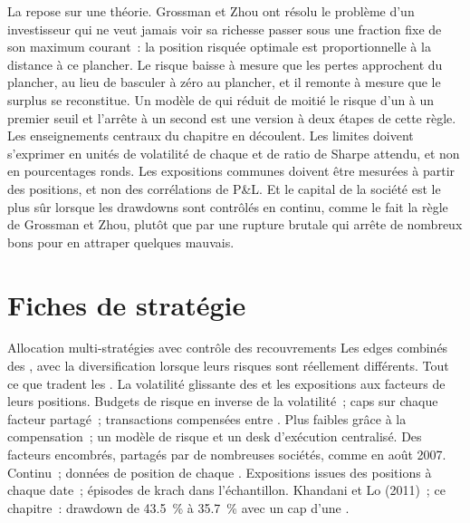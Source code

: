 La  repose sur une théorie. Grossman et Zhou ont résolu le problème d'un investisseur qui ne veut jamais voir sa richesse passer sous une fraction fixe de son
maximum courant~: la position risquée optimale est proportionnelle à la distance à ce plancher. Le risque baisse à mesure que les pertes approchent du plancher, au lieu de basculer
à zéro au plancher, et il remonte à mesure que le surplus se reconstitue. Un modèle de  qui réduit de moitié le risque d'un  à un premier seuil et l'arrête à un second est une version à deux étapes
de cette règle. Les enseignements centraux du chapitre en découlent. Les limites doivent s'exprimer en unités de volatilité de chaque  et de ratio de Sharpe attendu, et non en
pourcentages ronds. Les expositions communes doivent être mesurées à partir des positions, et non des corrélations de P\&L. Et le capital de la société est le plus sûr lorsque les drawdowns sont
contrôlés en continu, comme le fait la règle de Grossman et Zhou, plutôt que par une rupture brutale qui arrête de nombreux bons  pour en attraper quelques mauvais.

\section{Fiches de stratégie}

\begin{strategyfile}{Allocation multi-stratégies avec contrôle des recouvrements}\label{strat:s1:running-a-multi-strategy-book:overlap}
 Les edges combinés des , avec la diversification lorsque leurs risques sont réellement différents.
 Tout ce que tradent les .
 La volatilité glissante des  et les expositions aux facteurs de leurs positions.
 Budgets de risque en inverse de la volatilité~; caps sur chaque facteur partagé~; transactions compensées entre .
 Plus faibles grâce à la compensation~; un modèle de risque et un desk d'exécution centralisé.
 Des facteurs encombrés, partagés par de nombreuses sociétés, comme en août 2007.
 Continu~; données de position de chaque .
 Expositions issues des positions à chaque date~; épisodes de krach dans l'échantillon.
 Khandani et Lo (2011)~; ce chapitre~: drawdown de 43.5~\% à 35.7~\% avec un cap d'une .
\end{strategyfile}

